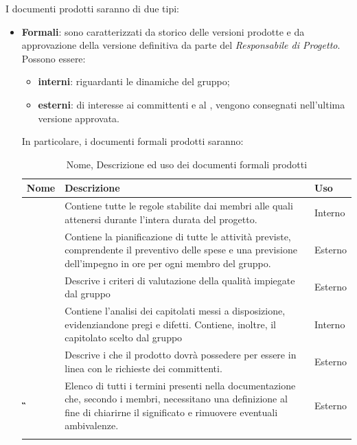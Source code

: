 {I documenti prodotti saranno di due tipi:
\begin{itemize}
	\item \textbf{Formali}: sono caratterizzati da storico delle versioni prodotte e da approvazione della versione definitiva da parte del \textit{Responsabile di Progetto}. Possono essere:
	\begin{itemize}
		\item \textbf{interni}: riguardanti le dinamiche del gruppo;
		\item \textbf{esterni}: di interesse ai committenti e al , vengono consegnati nell'ultima versione approvata.
	\end{itemize} 
In particolare, i documenti formali prodotti saranno:
{
	\setlength{\freewidth}{\dimexpr\textwidth-1\tabcolsep}
	\renewcommand{\arraystretch}{1.5}
	\setlength{\aboverulesep}{0pt}
	\setlength{\belowrulesep}{0pt}
	\begin{longtable}{L{.210\freewidth} L{.6\freewidth} L{.080\freewidth}}
		\toprule 
		\textbf{Nome} & \textbf{Descrizione} & \textbf{Uso}\\
		\toprule
		\endhead		
		\textbf{\NdP{}} & Contiene tutte le regole stabilite dai membri alle quali attenersi durante l'intera durata del progetto. & Interno \\ 
		\textbf{\PdP{}} & Contiene la pianificazione di tutte le attività previste, comprendente il preventivo delle spese e una previsione dell'impegno in ore per ogni membro del gruppo. & Esterno \\
		\textbf{\PdQ{}} & Descrive i criteri di valutazione della qualità impiegate dal gruppo & Esterno \\ 
		\textbf{\SdF{}} & Contiene l'analisi dei capitolati messi a disposizione, evidenziandone pregi e difetti. Contiene, inoltre, il capitolato scelto dal gruppo & Interno \\
		\textbf{\AdR{}} & Descrive i  che il prodotto dovrà possedere per essere in linea con le richieste dei committenti. & Esterno \\ 	
		\textbf{\G{}} & Elenco di tutti i termini presenti nella documentazione che, secondo i membri, necessitano una definizione al fine di chiarirne il significato e rimuovere eventuali ambivalenze. & Esterno \\  			
		\bottomrule
		\hiderowcolors
		\caption{Nome, Descrizione ed uso dei documenti formali prodotti}
	\end{longtable}
}


\end{itemize}}
